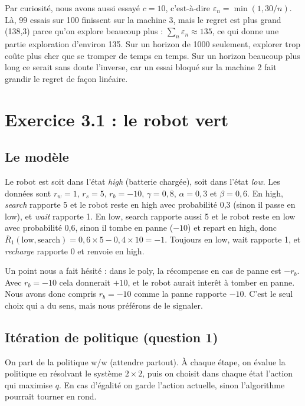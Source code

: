 \documentclass[11pt,a4paper]{article}
\begin{document}
Par curiosité, nous avons aussi essayé $c = 10$, c'est-à-dire $\varepsilon_n = \min(1, 30/n)$. Là, 99 essais sur 100 finissent sur la machine 3, mais le regret est plus grand (138,3) parce qu'on explore beaucoup plus : $\sum_n \varepsilon_n \approx 135$, ce qui donne une partie exploration d'environ 135. Sur un horizon de 1000 seulement, explorer \og trop\fg{} coûte plus cher que se tromper de temps en temps. Sur un horizon beaucoup plus long ce serait sans doute l'inverse, car un essai bloqué sur la machine 2 fait grandir le regret de façon linéaire.

\section{Exercice 3.1 : le robot vert}

\subsection{Le modèle}

Le robot est soit dans l'état \emph{high} (batterie chargée), soit dans l'état \emph{low}. Les données sont $r_w = 1$, $r_s = 5$, $r_b = -10$, $\gamma = 0,8$, $\alpha = 0,3$ et $\beta = 0,6$. En high, \emph{search} rapporte 5 et le robot reste en high avec probabilité 0,3 (sinon il passe en low), et \emph{wait} rapporte 1. En low, search rapporte aussi 5 et le robot reste en low avec probabilité 0,6, sinon il tombe en panne ($-10$) et repart en high, donc $\bar R_1(\text{low}, \text{search}) = 0,6 \times 5 - 0,4 \times 10 = -1$. Toujours en low, wait rapporte 1, et \emph{recharge} rapporte 0 et renvoie en high.

Un point nous a fait hésité : dans le poly, la récompense en cas de panne est $-r_b$. Avec $r_b = -10$ cela donnerait $+10$, et le robot aurait interêt à tomber en panne. Nous avons donc compris $r_b = -10$ comme \og la panne rapporte $-10$\fg{}. C'est le seul choix qui a du sens, mais nous préférons de le signaler.

\subsection{Itération de politique (question 1)}

On part de la politique w/w (attendre partout). À chaque étape, on évalue la politique en résolvant le système $2 \times 2$, puis on choisit dans chaque état l'action qui maximise $q$. En cas d'égalité on garde l'action actuelle, sinon l'algorithme pourrait tourner en rond.
\end{document}
